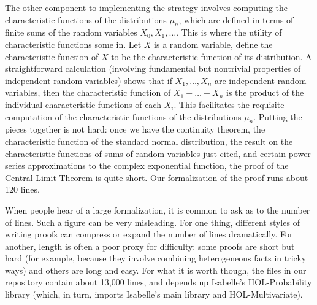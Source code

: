 \documentclass{article}
\begin{document}
The other component to implementing the strategy involves computing the characteristic functions of the distributions $\mu_n$, which are defined in terms of finite sums of the random variables $X_0, X_1, \ldots$. This is where the utility of characteristic functions some in. Let $X$ is a random variable, define the characteristic function of $X$ to be the characteristic function of its distribution. A straightforward calculation (involving fundamental but nontrivial properties of independent random variables) shows that if $X_1, \ldots, X_n$ are independent random variables, then the characteristic function of $X_1 + \ldots + X_n$ is the product of the individual characteristic functions of each $X_i$. This facilitates the requisite computation of the characteristic functions of the distributions $\mu_n$. Putting the pieces together is not hard: once we have the continuity theorem, the characteristic function of the standard normal distribution, the result on the characteristic functions of sums of random variables just cited, and certain power series approximations to the complex exponential function, the proof of the Central Limit Theorem is quite short. Our formalization of the proof runs about 120 lines. 

When people hear of a large formalization, it is common to ask as to the number of lines. Such a figure can be very misleading. For one thing, different styles of writing proofs can compress or expand the number of lines dramatically. For another, length is often a poor proxy for difficulty: some proofs are short but hard (for example, because they involve combining heterogeneous facts in tricky ways) and others are long and easy. For what it is worth though, the files in our repository contain about 13,000 lines, and depends up Isabelle's HOL-Probability library (which, in turn, imports Isabelle's main library and HOL-Multivariate).
\end{document}
